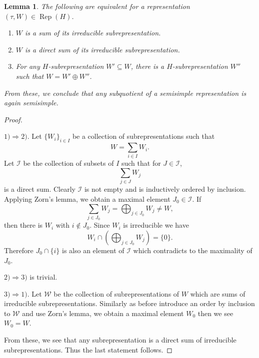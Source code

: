 \documentclass[8pt]{article}
\newtheorem{lemma}{Lemma}[section]
\DeclareMathOperator{\Rep}{Rep}
\begin{document}
\begin{lemma}
  \label{lemma_28}
  The following are equivalent for a representation $(\tau,W)\in\Rep(H)$.
  \begin{enumerate}[1).]
    \item $W$ is a sum of its irreducible subrepresentation.
    \item $W$ is a direct sum of its irreducible subrepresentation.
    \item For any $H$-subrepresentation $W'\subseteq W$, there is a $H$-subrepresentation $W''$ such that $W= W'\oplus W''$.
  \end{enumerate}
  From these, we conclude that any subquotient of a semisimple representation is again semisimple.
\end{lemma}

\begin{proof}$\:$
  \par $1)\Rightarrow 2)$. Let $\{W_i\}_{i\in I}$ be a collection of subrepresentations such that 
  \begin{equation*}
    W = \sum_{i\in I}W_i.
  \end{equation*}
  Let $\mathcal{I}$ be the collection of subsets of $I$ such that for $J\in\mathcal{I}$,
  \begin{equation*}
    \sum_{j\in J}W_j
  \end{equation*}
  is a direct sum. Clearly $\mathcal{I}$ is not empty and is inductively ordered by inclusion. Applying Zorn's lemma, we obtain a maximal element $J_0\in\mathcal{I}$.
  If 
  \begin{equation*}
    \sum_{j\in J_0}W_j = \bigoplus_{j\in J_0}W_j \not=W,
  \end{equation*}
  then there is $W_i$ with $i\not\in J_0$. Since $W_i$ is irreducible we have 
  \begin{equation*}
    W_i\cap\left(\bigoplus_{j\in J_0} W_j\right) = \{0\}.
  \end{equation*}
  Therefore $J_0\cap\{i\}$ is also an element of $\mathcal{I}$ which contradicts to the maximality of $J_0$. 
  \par $2)\Rightarrow 3)$ is trivial.
  \par $3)\Rightarrow 1)$. Let $\mathcal{W}$ be the collection of subrepresentations of $W$ which are sums of irreducible subrepresentations. 
  Similarly as before introduce an order by inclusion to $\mathcal{W}$ and use Zorn's lemma, we obtain a maximal element $W_0$ then we see $W_0 = W$.
  \par From these, we see that any subrepresentation is a direct sum of irreducible subrepresentations. Thus the last statement follows.
\end{proof}
\end{document}
